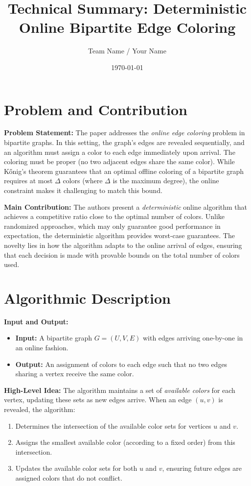 \documentclass[11pt]{article}
\title{Technical Summary: Deterministic Online Bipartite Edge Coloring}
\author{Team Name / Your Name}
\date{\today}
\begin{document}
\maketitle

\section{Problem and Contribution}
\textbf{Problem Statement:}  
The paper addresses the \emph{online edge coloring} problem in bipartite graphs. In this setting, the graph’s edges are revealed sequentially, and an algorithm must assign a color to each edge immediately upon arrival. The coloring must be proper (no two adjacent edges share the same color). While Kőnig’s theorem guarantees that an optimal offline coloring of a bipartite graph requires at most $\Delta$ colors (where $\Delta$ is the maximum degree), the online constraint makes it challenging to match this bound.

\textbf{Main Contribution:}  
The authors present a \emph{deterministic} online algorithm that achieves a competitive ratio close to the optimal number of colors. Unlike randomized approaches, which may only guarantee good performance in expectation, the deterministic algorithm provides worst-case guarantees. The novelty lies in how the algorithm adapts to the online arrival of edges, ensuring that each decision is made with provable bounds on the total number of colors used.

\section{Algorithmic Description}
\textbf{Input and Output:}  
\begin{itemize}[noitemsep]
    \item \textbf{Input:} A bipartite graph \(G=(U,V,E)\) with edges arriving one-by-one in an online fashion.
    \item \textbf{Output:} An assignment of colors to each edge such that no two edges sharing a vertex receive the same color.
\end{itemize}

\textbf{High-Level Idea:}  
The algorithm maintains a set of \emph{available colors} for each vertex, updating these sets as new edges arrive. When an edge \((u,v)\) is revealed, the algorithm:
\begin{enumerate}[noitemsep]
    \item Determines the intersection of the available color sets for vertices \(u\) and \(v\).
    \item Assigns the smallest available color (according to a fixed order) from this intersection.
    \item Updates the available color sets for both \(u\) and \(v\), ensuring future edges are assigned colors that do not conflict.
\end{enumerate}
\end{document}
